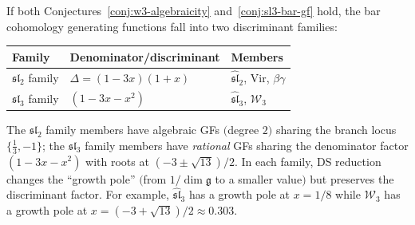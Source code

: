 \begin{remark}\label{rem:two-discriminant-families}
If both Conjectures~\ref{conj:w3-algebraicity}
and~\ref{conj:sl3-bar-gf} hold, the bar cohomology generating
functions fall into two discriminant families:
\begin{center}
\renewcommand{\arraystretch}{1.3}
\begin{tabular}{lll}
\toprule
\textbf{Family} & \textbf{Denominator/discriminant}
  & \textbf{Members} \\
\midrule
$\mathfrak{sl}_2$ family &
  $\Delta = (1-3x)(1+x)$ &
  $\widehat{\mathfrak{sl}}_2$, $\mathrm{Vir}$, $\beta\gamma$ \\
$\mathfrak{sl}_3$ family &
  $(1-3x-x^2)$ &
  $\widehat{\mathfrak{sl}}_3$, $\mathcal{W}_3$ \\
\bottomrule
\end{tabular}
\end{center}
The $\mathfrak{sl}_2$ family members have algebraic GFs
$($degree $2)$ sharing the branch locus
$\{\tfrac{1}{3}, -1\}$;
the $\mathfrak{sl}_3$ family members have \emph{rational} GFs
sharing the denominator factor $(1-3x-x^2)$ with
roots at $(-3 \pm \sqrt{13})/2$.
In each family, DS reduction changes the ``growth pole''
$($from $1/\dim\mathfrak{g}$ to a smaller value$)$
but preserves the discriminant factor.
For example, $\widehat{\mathfrak{sl}}_3$ has a
growth pole at $x = 1/8$ while $\mathcal{W}_3$ has a
growth pole at $x = (-3+\sqrt{13})/2 \approx 0.303$.
\end{remark}

